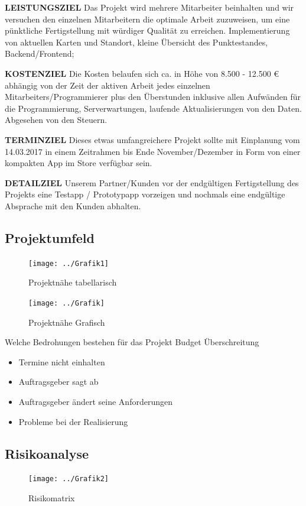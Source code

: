\textbf {LEISTUNGSZIEL} Das Projekt wird mehrere Mitarbeiter beinhalten und wir versuchen den einzelnen Mitarbeitern die optimale Arbeit zuzuweisen, um eine pünktliche Fertigstellung mit würdiger Qualität zu erreichen. Implementierung von aktuellen Karten und Standort, kleine Übersicht des Punktestandes, Backend/Frontend;


\textbf {KOSTENZIEL} Die Kosten belaufen sich ca. in Höhe von 8.500 - 12.500 € abhängig von der Zeit der aktiven Arbeit jedes einzelnen Mitarbeiters/Programmierer plus den Überstunden inklusive allen Aufwänden für die Programmierung, Serverwartungen, laufende Aktualisierungen von den Daten. Abgesehen von den Steuern.


\textbf {TERMINZIEL} Dieses etwas umfangreichere Projekt sollte mit Einplanung vom 14.03.2017 in einem Zeitrahmen bis Ende November/Dezember in Form von einer kompakten App im Store verfügbar sein.


\textbf {DETAILZIEL} Unserem Partner/Kunden vor der endgültigen Fertigstellung des Projekts eine Testapp /  Prototypapp vorzeigen und nochmals eine endgültige Absprache mit den Kunden abhalten.



\subsection{Projektumfeld}

\begin{figure}
	\centering
	\texttt{[image: ../Grafik1]}
	\caption{Projektnähe tabellarisch}
	\label{fig:grafik1}
\end{figure}


\begin{figure}
	\centering
	\texttt{[image: ../Grafik]}
	\caption{Projektnähe Grafisch}
	\label{fig:grafik}
\end{figure}




Welche Bedrohungen bestehen für das Projekt
Budget Überschreitung
\begin{itemize}
	\item Termine nicht einhalten
	\item Auftragsgeber sagt ab
	\item Auftragsgeber ändert seine Anforderungen
	\item Probleme bei der Realisierung
\end{itemize}



\subsection{Risikoanalyse}
\begin{figure}
	\centering
	\texttt{[image: ../Grafik2]}
	\caption{Risikomatrix}
	\label{fig:grafik2}
\end{figure}

